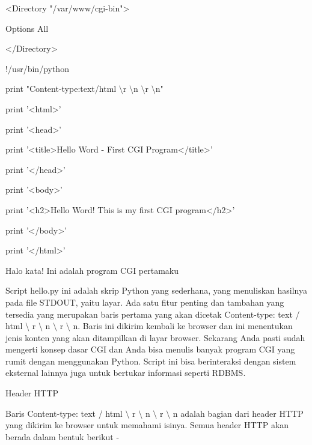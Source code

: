 \begin {enumerate}
\vspace{12pt}
\noindent 
<Directory "/var/www/cgi-bin"> \par
\noindent 
Options All \par
\noindent 
</Directory> \par
\vspace{12pt}
\noindent 
!/usr/bin/python \par
\vspace{12pt}
\noindent 
print "Content-type:text/html $  \setminus  $r $  \setminus  $n $  \setminus  $r $  \setminus  $n" \par
\noindent 
print '<html>' \par
\noindent 
print '<head>' \par
\noindent 
print '<title>Hello Word - First CGI Program</title>' \par
\noindent 
print '</head>' \par
\noindent 
print '<body>' \par
\noindent 
print '<h2>Hello Word! This is my first CGI program</h2>' \par
\noindent 
print '</body>' \par
\noindent 
print '</html>' \par
\vspace{12pt}
\vspace{12pt}
\noindent 
Halo kata! Ini adalah program CGI pertamaku \par
\vspace{12pt}
Script hello.py ini adalah skrip Python yang sederhana, yang menuliskan hasilnya pada file STDOUT, yaitu layar. Ada satu fitur penting dan tambahan yang tersedia yang merupakan baris pertama yang akan dicetak Content-type: text / html  $  \setminus  $ r  $  \setminus  $ n  $  \setminus  $ r  $  \setminus  $ n. Baris ini dikirim kembali ke browser dan ini menentukan jenis konten yang akan ditampilkan di layar browser. Sekarang Anda pasti sudah mengerti konsep dasar CGI dan Anda bisa menulis banyak program CGI yang rumit dengan menggunakan Python. Script ini bisa berinteraksi dengan sistem eksternal lainnya juga untuk bertukar informasi seperti RDBMS. \par
\vspace{12pt}
\vspace{12pt}
\vspace{12pt}
\vspace{12pt}
\noindent 
Header HTTP \par
\vspace{12pt}
\noindent 
Baris Content-type: text / html  $  \setminus  $ r  $  \setminus  $ n  $  \setminus  $ r  $  \setminus  $ n adalah bagian dari header HTTP yang dikirim ke browser untuk memahami isinya. Semua header HTTP akan berada dalam bentuk berikut - \par

\end{enumerate}
